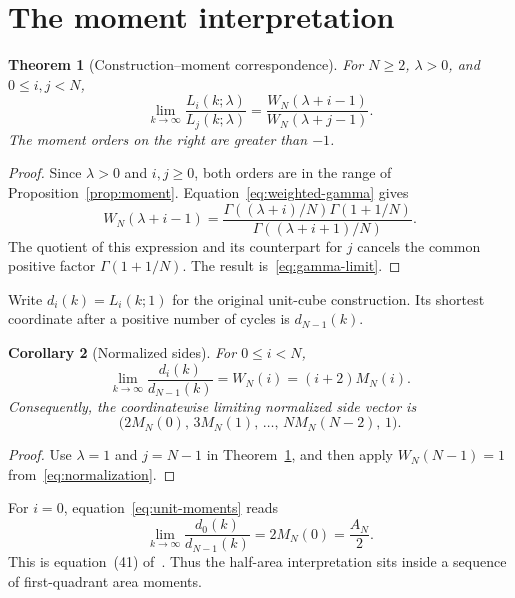 \documentclass[11pt]{article}
\numberwithin{equation}{section}
\newtheorem{theorem}{Theorem}[section]
\newtheorem{corollary}[theorem]{Corollary}
\theoremstyle{remark}
\begin{document}
\section{The moment interpretation}
\label{sec:correspondence}

\begin{theorem}[Construction--moment correspondence]
\label{thm:correspondence}
For $N\geq2$, $\lambda>0$, and $0\leq i,j<N$,
\begin{equation}
  \boxed{\displaystyle
  \lim_{k\to\infty}\frac{L_i(k;\lambda)}{L_j(k;\lambda)}
    =\frac{W_N(\lambda+i-1)}{W_N(\lambda+j-1)}.}
  \label{eq:correspondence}
\end{equation}
The moment orders on the right are greater than $-1$.
\end{theorem}

\begin{proof}
Since $\lambda>0$ and $i,j\geq0$, both orders are in the range
of Proposition~\ref{prop:moment}. Equation~\eqref{eq:weighted-gamma}
gives
\[
  W_N(\lambda+i-1)
    =\frac{\Gamma((\lambda+i)/N)\Gamma(1+1/N)}
            {\Gamma((\lambda+i+1)/N)}.
\]
The quotient of this expression and its counterpart for $j$
cancels the common positive factor $\Gamma(1+1/N)$.
The result is~\eqref{eq:gamma-limit}.
\end{proof}

Write $d_i(k)=L_i(k;1)$ for the original unit-cube construction.
Its shortest coordinate after a positive number of cycles is
$d_{N-1}(k)$.

\begin{corollary}[Normalized sides]
\label{cor:unit}
For $0\leq i<N$,
\begin{equation}
  \lim_{k\to\infty}\frac{d_i(k)}{d_{N-1}(k)}
     =W_N(i)=(i+2)M_N(i).
  \label{eq:unit-moments}
\end{equation}
Consequently, the coordinatewise limiting normalized side vector is
\begin{equation}
  \bigl(2M_N(0),\,3M_N(1),\,\ldots,\,NM_N(N-2),\,1\bigr).
  \label{eq:side-vector}
\end{equation}
\end{corollary}

\begin{proof}
Use $\lambda=1$ and $j=N-1$ in
Theorem~\ref{thm:correspondence}, and then apply
$W_N(N-1)=1$ from~\eqref{eq:normalization}.
\end{proof}

For $i=0$, equation~\eqref{eq:unit-moments} reads
\[
  \lim_{k\to\infty}\frac{d_0(k)}{d_{N-1}(k)}
     =2M_N(0)=\frac{A_N}{2}.
\]
This is equation~(41) of~\cite{FitzhughFarnsworth2013}.
Thus the half-area interpretation sits inside a sequence of
first-quadrant area moments.
\end{document}

